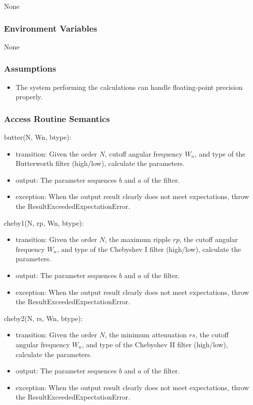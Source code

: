 \documentclass[12pt, titlepage]{article}
\begin{document}
None

\subsubsection{Environment Variables}

None

\subsubsection{Assumptions}

\begin{itemize}
\item The system performing the calculations can handle floating-point precision
properly.
\end{itemize}

\subsubsection{Access Routine Semantics}

\noindent butter(N, Wn, btype):
\begin{itemize}
\item transition: Given the order $N$, cutoff angular frequency $W_n$, and type
of the Butterworth filter (high/low), calculate the parameters.
\item output: The parameter sequences $b$ and $a$ of the filter.
\item exception: When the output result clearly does not meet expectations,
throw the ResultExceededExpectationError.
\end{itemize}

\noindent cheby1(N, rp, Wn, btype):
\begin{itemize}
\item transition: Given the order $N$, the maximum ripple $rp$, the cutoff
angular frequency $W_n$, and type of the Chebyshev I filter (high/low),
calculate the parameters.
\item output: The parameter sequences $b$ and $a$ of the filter.
\item exception: When the output result clearly does not meet expectations,
throw the ResultExceededExpectationError.
\end{itemize}

\noindent cheby2(N, rs, Wn, btype):
\begin{itemize}
\item transition: Given the order $N$, the minimum attenuation $rs$, the cutoff
angular frequency $W_n$, and type of the Chebyshev II filter (high/low),
calculate the parameters.
\item output: The parameter sequences $b$ and $a$ of the filter.
\item exception: When the output result clearly does not meet expectations,
throw the ResultExceededExpectationError.
\end{itemize}
\end{document}
